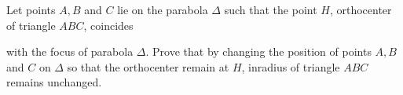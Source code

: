 Let points $A, B$ and $C$ lie on the parabola $\Delta$ such that the point $H$,  orthocenter of triangle $ABC$,  coincides

with the focus of parabola $\Delta$. Prove that by changing the position of points $A, B$ and $C$ on $\Delta$ so that the orthocenter remain at $H$,  inradius of triangle $ABC$ remains unchanged.